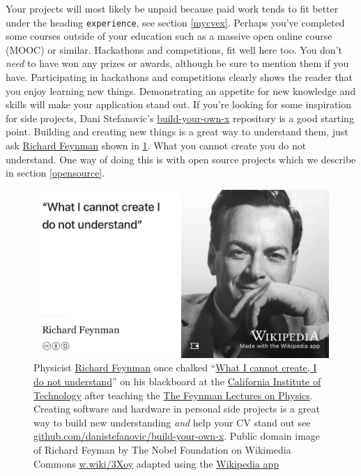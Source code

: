 \documentclass[
]{book}
\begin{document}
Your projects will most likely be unpaid because paid work tends to fit better under the heading \texttt{experience}, see section \ref{mycvex}. Perhaps you've completed some courses outside of your education such as a massive open online course (MOOC) or similar. Hackathons and competitions, fit well here too. \citep{hafb} You don't \emph{need} to have won any prizes or awards, although be sure to mention them if you have. Participating in hackathons and competitions clearly shows the reader that you enjoy learning new things. Demonstrating an appetite for new knowledge and skills will make your application stand out. If you're looking for some inspiration for side projects, Dani Stefanovic's \href{https://github.com/danistefanovic/build-your-own-x}{build-your-own-x} repository is a good starting point. Building and creating new things is a great way to understand them, just ask \href{https://en.wikipedia.org/wiki/Richard_Feynman}{Richard Feynman} shown in \ref{fig:feynman-fig}. What you cannot create you do not understand. One way of doing this is with open source projects which we describe in section \ref{opensource}.

\begin{figure}

{\centering \includegraphics[width=1\linewidth]{images/what-I-cannot-create-I-do-not-understand} 

}

\caption{Physicist \href{https://en.wikipedia.org/wiki/Richard_Feynman}{Richard Feynman} once chalked ``\href{https://calisphere.org/item/b3e8d3cb9b8adc01314dba1b1f1fcf84/}{What I cannot create, I do not understand}'' on his blackboard at the \href{https://en.wikipedia.org/wiki/California_Institute_of_Technology}{California Institute of Technology} after teaching the \href{https://en.wikipedia.org/wiki/The_Feynman_Lectures_on_Physics}{The Feynman Lectures on Physics}. \citep{Way2017} Creating software and hardware in personal side projects is a great way to build new understanding \emph{and} help your CV stand out see \href{https://github.com/danistefanovic/build-your-own-x}{github.com/danistefanovic/build-your-own-x}. Public domain image of Richard Feyman by The Nobel Foundation on Wikimedia Commons \href{https://w.wiki/3Xoy}{w.wiki/3Xoy} adapted using the \href{https://apps.apple.com/us/app/wikipedia/id324715238}{Wikipedia app}}\label{fig:feynman-fig}
\end{figure}
\end{document}
